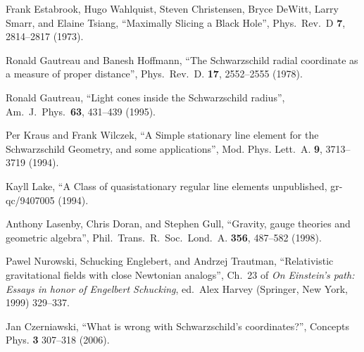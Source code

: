 \documentclass[twocolumn,showpacs,preprintnumbers,amsmath,amssymb,prb]{revtex4}
\begin{document}
\begin{thebibliography}{}
Frank Estabrook, Hugo Wahlquist, Steven Christensen, Bryce DeWitt, Larry Smarr,
and Elaine Tsiang,
``Maximally Slicing a Black Hole'',
Phys.\ Rev.\ D \textbf{7}, 2814--2817 (1973).

Ronald Gautreau and Banesh Hoffmann,
``The Schwarzschild radial coordinate as a measure of proper distance'',
Phys.\ Rev.\ D. \textbf{17}, 2552--2555 (1978).


Ronald Gautreau,
``Light cones inside the Schwarzschild radius'',
Am.\ J.\ Phys.\ \textbf{63}, 431--439 (1995).

Per Kraus and Frank Wilczek,
``A Simple stationary line element for the Schwarzschild Geometry,
and some applications'',
Mod. Phys. Lett.\ A. \textbf{9}, 3713--3719 (1994).

Kayll Lake,
``A Class of quasistationary regular line elements
unpublished,
gr-qc/9407005 (1994).

Anthony Lasenby, Chris Doran, and Stephen Gull,
``Gravity, gauge theories and geometric algebra'',
Phil.\ Trans.\ R.\ Soc.\ Lond.\ A. \textbf{356}, 487--582 (1998).

Pawel Nurowski, Schucking Englebert, and Andrzej Trautman,
``Relativistic gravitational fields with close Newtonian analogs'',
Ch.\ 23 of
{\sl On Einstein's path: Essays in honor of Engelbert Schucking},
ed.\ Alex Harvey
(Springer, New York, 1999)
329--337.

Jan Czerniawski,
``What is wrong with Schwarzschild's coordinates?'',
Concepts Phys. \textbf{3} 307--318 (2006).





\end{thebibliography}
\end{document}
